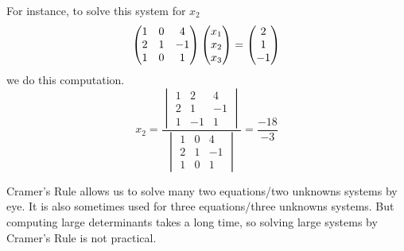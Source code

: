 For instance, to solve this system for \( x_2 \)
\begin{equation*}
  \begin{pmatrix}
    1  &0  &4  \\
    2  &1  &-1 \\
    1  &0  &1
  \end{pmatrix}
  \begin{pmatrix} x_1 \\ x_2 \\ x_3 \end{pmatrix}
  =\begin{pmatrix} 2 \\ 1 \\ -1 \end{pmatrix}
\end{equation*}
we do this computation.
\begin{equation*}
  x_2=
  \frac{ \begin{vmatrix}
           1  &2  &4  \\
           2  &1  &-1 \\
           1  &-1 &1
         \end{vmatrix}  }{
         \begin{vmatrix}
           1  &0  &4  \\
           2  &1  &-1 \\
           1  &0  &1
         \end{vmatrix}  }
  =\frac{-18}{-3}
\end{equation*}

Cramer's Rule allows us to solve 
many two equations/two unknowns systems by eye.
It is also sometimes used for three equations/three unknowns systems.
But computing large determinants takes a long time, so solving
large systems by Cramer's Rule is not practical.

